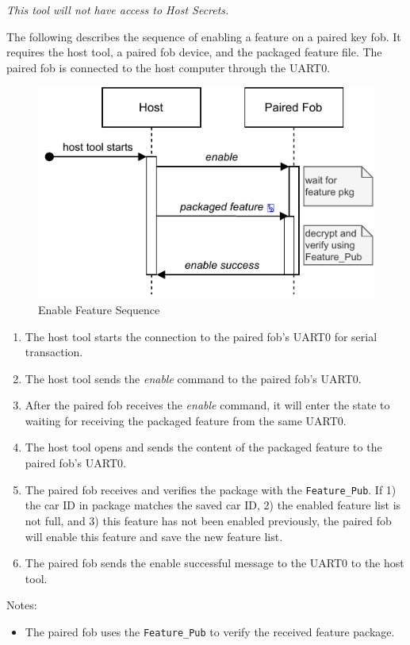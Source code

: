 \documentclass[11pt,oneside,onecolumn,letterpaper]{article}
\begin{document}
\textit{This tool will not have access to Host Secrets.}

The following describes the sequence of enabling a feature on a paired key fob. It requires the host tool, a paired fob device, and the packaged feature file. The paired fob is connected to the host computer through the UART0.

\begin{figure}[!htbp]
	\begin{centering}
		\includegraphics[width = .5\textwidth]{pic/enable.pdf}
		\caption{Enable Feature Sequence}
		\label{fig:enable}
	\end{centering}
\end{figure}

\begin{enumerate}
	\item The host tool starts the connection to the paired fob's UART0 for serial transaction.
	\item The host tool sends the \textit{enable} command to the paired fob's UART0.
	\item After the paired fob receives the \textit{enable} command, it will enter the state to waiting for receiving the packaged feature from the same UART0.
	\item The host tool opens and sends the content of the packaged feature to the paired fob's UART0.
	\item The paired fob receives and verifies the package with the \verb|Feature_Pub|. If 1) the car ID in package matches the saved car ID, 2) the enabled feature list is not full, and 3) this feature has not been enabled previously, the paired fob will enable this feature and save the new feature list.
	\item The paired fob sends the enable successful message to the UART0 to the host tool.
\end{enumerate}

Notes:
\begin{itemize}
	\item The paired fob uses the \verb|Feature_Pub| to verify the received feature package.
\end{itemize}
\end{document}
